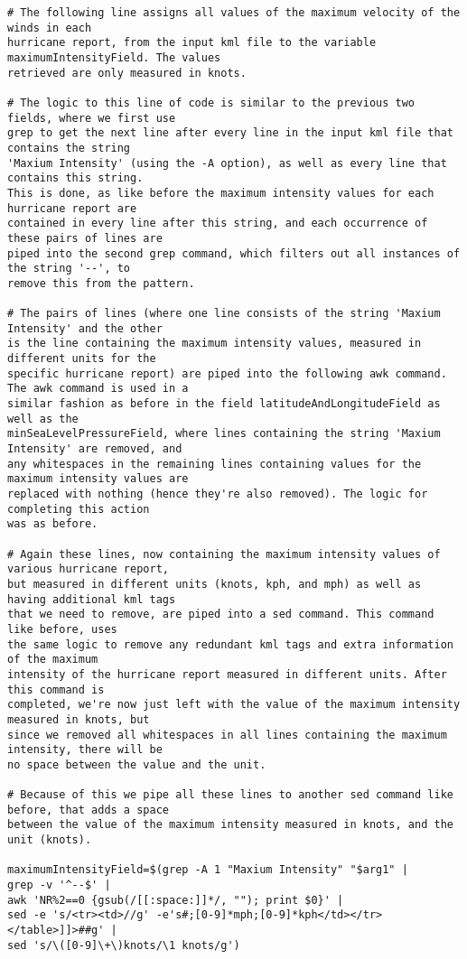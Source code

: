 \documentclass[]{article} %
\begin{document}
\begin{verbatim}
# The following line assigns all values of the maximum velocity of the winds in each 
hurricane report, from the input kml file to the variable maximumIntensityField. The values 
retrieved are only measured in knots. 

# The logic to this line of code is similar to the previous two fields, where we first use 
grep to get the next line after every line in the input kml file that contains the string 
'Maxium Intensity' (using the -A option), as well as every line that contains this string. 
This is done, as like before the maximum intensity values for each hurricane report are 
contained in every line after this string, and each occurrence of these pairs of lines are 
piped into the second grep command, which filters out all instances of the string '--', to 
remove this from the pattern.

# The pairs of lines (where one line consists of the string 'Maxium Intensity' and the other 
is the line containing the maximum intensity values, measured in different units for the 
specific hurricane report) are piped into the following awk command. The awk command is used in a 
similar fashion as before in the field latitudeAndLongitudeField as well as the 
minSeaLevelPressureField, where lines containing the string 'Maxium Intensity' are removed, and 
any whitespaces in the remaining lines containing values for the maximum intensity values are 
replaced with nothing (hence they're also removed). The logic for completing this action 
was as before.

# Again these lines, now containing the maximum intensity values of various hurricane report, 
but measured in different units (knots, kph, and mph) as well as having additional kml tags 
that we need to remove, are piped into a sed command. This command like before, uses 
the same logic to remove any redundant kml tags and extra information of the maximum 
intensity of the hurricane report measured in different units. After this command is 
completed, we're now just left with the value of the maximum intensity measured in knots, but 
since we removed all whitespaces in all lines containing the maximum intensity, there will be 
no space between the value and the unit.

# Because of this we pipe all these lines to another sed command like before, that adds a space 
between the value of the maximum intensity measured in knots, and the unit (knots).

maximumIntensityField=$(grep -A 1 "Maxium Intensity" "$arg1" | 
grep -v '^--$' | 
awk 'NR%2==0 {gsub(/[[:space:]]*/, ""); print $0}' | 
sed -e 's/<tr><td>//g' -e's#;[0-9]*mph;[0-9]*kph</td></tr></table>]]>##g' | 
sed 's/\([0-9]\+\)knots/\1 knots/g')




\end{verbatim}
\end{document}
